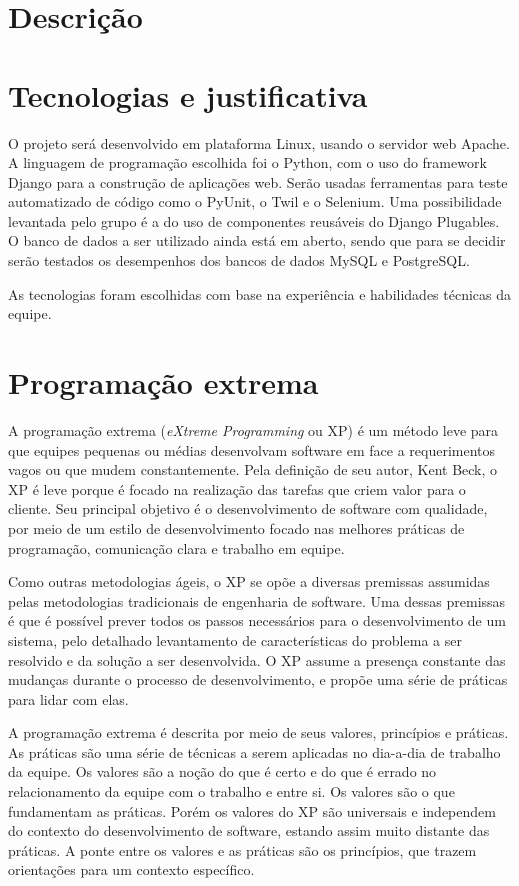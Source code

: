 \documentclass[a4paper,12pt,font=plain,header=plain]{abnt}
\begin{document}
  \section{Descrição}

  \section{Tecnologias e justificativa}
    O projeto será desenvolvido em plataforma Linux, usando o servidor web Apache. A linguagem de programação escolhida foi o Python, com o uso do framework Django para a construção de aplicações web. Serão usadas ferramentas para teste automatizado de código como o PyUnit, o Twil e o Selenium. Uma possibilidade levantada pelo grupo é a do uso de componentes reusáveis do Django Plugables. O banco de dados a ser utilizado ainda está em aberto, sendo que para se decidir serão testados os desempenhos dos bancos de dados MySQL e PostgreSQL.

    As tecnologias foram escolhidas com base na experiência e habilidades técnicas da equipe.

  \section{Programação extrema}
    A programação extrema (\textit{eXtreme Programming} ou XP) é um método leve para que equipes pequenas ou médias desenvolvam software em face a requerimentos vagos ou que mudem constantemente\cite{beck04}. Pela definição de seu autor, Kent Beck, o XP é leve porque é focado na realização das tarefas que criem valor para o cliente. Seu principal objetivo é o desenvolvimento de software com qualidade, por meio de um estilo de desenvolvimento focado nas melhores práticas de programação, comunicação clara e trabalho em equipe.

    Como outras metodologias ágeis, o XP se opõe a diversas premissas assumidas pelas metodologias tradicionais de engenharia de software. Uma dessas premissas é que é possível prever todos os passos necessários para o desenvolvimento de um sistema, pelo detalhado levantamento de características do problema a ser resolvido e da solução a ser desenvolvida. O XP assume a presença constante das mudanças durante o processo de desenvolvimento, e propõe uma série de práticas para lidar com elas.

    A programação extrema é descrita por meio de seus valores, princípios e práticas. As práticas são uma série de técnicas a serem aplicadas no dia-a-dia de trabalho da equipe. Os valores são a noção do que é certo e do que é errado no relacionamento da equipe com o trabalho e entre si. Os valores são o que fundamentam as práticas. Porém os valores do XP são universais e independem do contexto do desenvolvimento de software, estando assim muito distante das práticas. A ponte entre os valores e as práticas são os princípios, que trazem orientações para um contexto específico.
\end{document}
